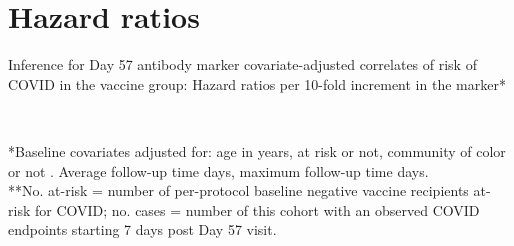 \documentclass[]{book}
\theoremstyle{definition}
\theoremstyle{definition}
\theoremstyle{definition}
\newcommand{\1}{\mathbbm{1}}
\begin{document}
\hypertarget{hazard-ratios}{%
\section{Hazard ratios}\label{hazard-ratios}}

\begin{table}[H]
\caption{Inference for Day 57 antibody marker covariate-adjusted correlates of risk of COVID in the vaccine group: Hazard ratios per 10-fold increment in the marker*}
\begin{center}
    \\
\end{center}
*Baseline covariates adjusted for: age in years, at risk or not, community of color or not
. Average follow-up time  days, maximum follow-up time  days.\\
**No. at-risk = number of per-protocol baseline negative vaccine recipients at-risk for COVID; no. cases = number of this cohort with an observed COVID endpoints starting 7 days post Day 57 visit.

\end{table}
\end{document}
